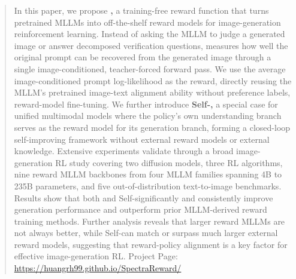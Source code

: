 \begin{abstract}
In this paper, we propose \textbf{\method,} a training-free reward function that turns pretrained MLLMs into off-the-shelf reward models
for image-generation reinforcement learning. 
Instead of asking the MLLM to judge a generated image or answer decomposed verification questions,
\method measures how well the original prompt can be recovered from the generated image through a single image-conditioned, teacher-forced forward pass. 
We use the average image-conditioned prompt log-likelihood as the reward, directly reusing the MLLM's pretrained image-text alignment ability without
preference labels, reward-model fine-tuning.
We further introduce \textbf{Self-\method,} a special case for unified multimodal models where the policy's own understanding branch serves as the reward model for its
generation branch, forming a closed-loop self-improving framework without external reward models or external knowledge. 
Extensive experiments validate \method through a broad image-generation RL study covering two diffusion models, three RL algorithms, 
nine reward MLLM backbones from four MLLM families spanning 4B to 235B parameters, and five out-of-distribution text-to-image benchmarks. 
Results show that both \method and Self-\method significantly and consistently improve generation performance and outperform prior MLLM-derived reward training methods. 
Further analysis reveals that larger reward MLLMs are not always better, while Self-\method can match or surpass much larger external reward models,
suggesting that reward-policy alignment is a key factor for effective image-generation RL. Project Page: \url{https://huangrh99.github.io/SpectraReward/}
\end{abstract}
